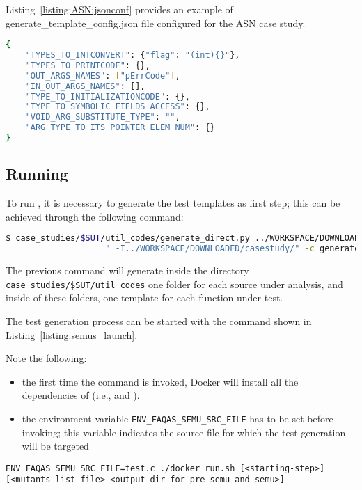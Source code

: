 Listing~\ref{listing:ASN:jsonconf} provides an example of generate\_template\_config.json file configured for the ASN case study.

\begin{lstlisting}[language=bash,label=listing:ASN:jsonconf,caption=generate\_template\_config.json file for ASN case study.]
{
    "TYPES_TO_INTCONVERT": {"flag": "(int){}"},
    "TYPES_TO_PRINTCODE": {},
    "OUT_ARGS_NAMES": ["pErrCode"],
    "IN_OUT_ARGS_NAMES": [],
    "TYPE_TO_INITIALIZATIONCODE": {},
    "TYPE_TO_SYMBOLIC_FIELDS_ACCESS": {},
    "VOID_ARG_SUBSTITUTE_TYPE": "",
    "ARG_TYPE_TO_ITS_POINTER_ELEM_NUM": {}
}
\end{lstlisting}

\subsection{Running \SEMUS}
\label{sec:semuslaunch}

To run \SEMUS, it is necessary to generate the test templates as first step; this can be achieved through the following command:

\begin{lstlisting}[language=bash]
 $ case_studies/$SUT/util_codes/generate_direct.py ../WORKSPACE/DOWNLOADED/casestudy/test.c direct \
                    " -I../WORKSPACE/DOWNLOADED/casestudy/" -c generate_template_config.json

\end{lstlisting}

The previous command will generate inside the directory \texttt{case\_studies/\$SUT/util\_codes} one folder for each source under analysis, and inside of these folders, one template for each function under test.

The test generation process can be started with the command shown in Listing~\ref{listing:semus_launch}.

Note the following:
\begin{itemize}
	\item the first time the command is invoked, Docker will install all the dependencies of \SEMUS (i.e., \SEMU and \MASS).
	\item the environment variable \texttt{ENV\_FAQAS\_SEMU\_SRC\_FILE} has to be set before invoking; this variable indicates the source file for which the test generation will be targeted
\end{itemize}

\begin{lstlisting}[language={}, label=listing:semus_launch]
ENV_FAQAS_SEMU_SRC_FILE=test.c ./docker_run.sh [<starting-step>] [<mutants-list-file> <output-dir-for-pre-semu-and-semu>]
\end{lstlisting}

